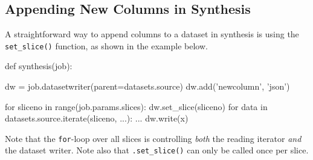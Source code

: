 \subsection{Appending New Columns in Synthesis}

A straightforward way to append columns to a dataset in synthesis is
using the \texttt{set\_slice()} function, as shown in the example
below.
\begin{python}
def synthesis(job):

    dw = job.datasetwriter(parent=datasets.source)
    dw.add('newcolumn', 'json')
    
    for sliceno in range(job.params.slices):
        dw.set_slice(sliceno)
        for data in datasets.source.iterate(sliceno, ...):
            ...
            dw.write(x)
\end{python}
Note that the \texttt{for}-loop over all slices is
controlling \textsl{both} the reading iterator \textsl{and} the
dataset writer.  Note also that \texttt{.set\_slice()} can only be
called once per slice.
